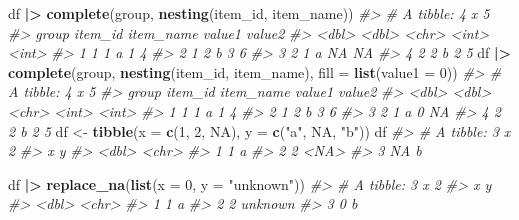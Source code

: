 \documentclass[
]{book}
\newenvironment{Shaded}{\begin{snugshade}}{\end{snugshade}}
\newcommand{\AttributeTok}[1]{\textcolor[rgb]{0.13,0.29,0.53}{#1}}
\newcommand{\CommentTok}[1]{\textcolor[rgb]{0.56,0.35,0.01}{\textit{#1}}}
\newcommand{\ConstantTok}[1]{\textcolor[rgb]{0.56,0.35,0.01}{#1}}
\newcommand{\DecValTok}[1]{\textcolor[rgb]{0.00,0.00,0.81}{#1}}
\newcommand{\FunctionTok}[1]{\textcolor[rgb]{0.13,0.29,0.53}{\textbf{#1}}}
\newcommand{\NormalTok}[1]{#1}
\newcommand{\OtherTok}[1]{\textcolor[rgb]{0.56,0.35,0.01}{#1}}
\newcommand{\SpecialCharTok}[1]{\textcolor[rgb]{0.81,0.36,0.00}{\textbf{#1}}}
\newcommand{\StringTok}[1]{\textcolor[rgb]{0.31,0.60,0.02}{#1}}
\begin{document}
\begin{Shaded}
\begin{Highlighting}[]
\NormalTok{df }\SpecialCharTok{|\textgreater{}} \FunctionTok{complete}\NormalTok{(group, }\FunctionTok{nesting}\NormalTok{(item\_id, item\_name))}
\CommentTok{\#\textgreater{} \# A tibble: 4 x 5}
\CommentTok{\#\textgreater{}   group item\_id item\_name value1 value2}
\CommentTok{\#\textgreater{}   \textless{}dbl\textgreater{}   \textless{}dbl\textgreater{} \textless{}chr\textgreater{}      \textless{}int\textgreater{}  \textless{}int\textgreater{}}
\CommentTok{\#\textgreater{} 1     1       1 a              1      4}
\CommentTok{\#\textgreater{} 2     1       2 b              3      6}
\CommentTok{\#\textgreater{} 3     2       1 a             NA     NA}
\CommentTok{\#\textgreater{} 4     2       2 b              2      5}
\NormalTok{df }\SpecialCharTok{|\textgreater{}} \FunctionTok{complete}\NormalTok{(group, }\FunctionTok{nesting}\NormalTok{(item\_id, item\_name), }
                 \AttributeTok{fill =} \FunctionTok{list}\NormalTok{(}\AttributeTok{value1 =} \DecValTok{0}\NormalTok{))}
\CommentTok{\#\textgreater{} \# A tibble: 4 x 5}
\CommentTok{\#\textgreater{}   group item\_id item\_name value1 value2}
\CommentTok{\#\textgreater{}   \textless{}dbl\textgreater{}   \textless{}dbl\textgreater{} \textless{}chr\textgreater{}      \textless{}int\textgreater{}  \textless{}int\textgreater{}}
\CommentTok{\#\textgreater{} 1     1       1 a              1      4}
\CommentTok{\#\textgreater{} 2     1       2 b              3      6}
\CommentTok{\#\textgreater{} 3     2       1 a              0     NA}
\CommentTok{\#\textgreater{} 4     2       2 b              2      5}
\NormalTok{df }\OtherTok{\textless{}{-}} \FunctionTok{tibble}\NormalTok{(}\AttributeTok{x =} \FunctionTok{c}\NormalTok{(}\DecValTok{1}\NormalTok{, }\DecValTok{2}\NormalTok{, }\ConstantTok{NA}\NormalTok{), }\AttributeTok{y =} \FunctionTok{c}\NormalTok{(}\StringTok{"a"}\NormalTok{, }\ConstantTok{NA}\NormalTok{, }\StringTok{"b"}\NormalTok{))}
\NormalTok{df}
\CommentTok{\#\textgreater{} \# A tibble: 3 x 2}
\CommentTok{\#\textgreater{}       x y    }
\CommentTok{\#\textgreater{}   \textless{}dbl\textgreater{} \textless{}chr\textgreater{}}
\CommentTok{\#\textgreater{} 1     1 a    }
\CommentTok{\#\textgreater{} 2     2 \textless{}NA\textgreater{} }
\CommentTok{\#\textgreater{} 3    NA b}
  
\NormalTok{df }\SpecialCharTok{|\textgreater{}} \FunctionTok{replace\_na}\NormalTok{(}\FunctionTok{list}\NormalTok{(}\AttributeTok{x =} \DecValTok{0}\NormalTok{, }\AttributeTok{y =} \StringTok{"unknown"}\NormalTok{))}
\CommentTok{\#\textgreater{} \# A tibble: 3 x 2}
\CommentTok{\#\textgreater{}       x y      }
\CommentTok{\#\textgreater{}   \textless{}dbl\textgreater{} \textless{}chr\textgreater{}  }
\CommentTok{\#\textgreater{} 1     1 a      }
\CommentTok{\#\textgreater{} 2     2 unknown}
\CommentTok{\#\textgreater{} 3     0 b}
  

\end{Highlighting}
\end{Shaded}
\end{document}

